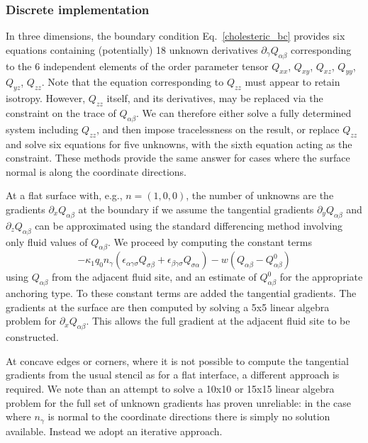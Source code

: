 \subsubsection{Discrete implementation}

In three dimensions, the boundary condition Eq.~\ref{cholesteric_bc}
provides six equations containing (potentially) 18 unknown derivatives
$\partial_\gamma Q_{\alpha\beta}$
corresponding to the 6 independent elements of the order parameter
tensor $Q_{xx}$, $Q_{xy}$, $Q_{xz}$, $Q_{yy}$, $Q_{yz}$, $Q_{zz}$.
Note that the equation corresponding to $Q_{zz}$ must appear to
retain isotropy. However, $Q_{zz}$ itself, and its derivatives,
 may be replaced via the
constraint on the trace of $Q_{\alpha\beta}$. We can therefore either
solve a fully determined system including $Q_{zz}$, and then impose
tracelessness on the result, or replace $Q_{zz}$ and solve six
equations for five unknowns, with the sixth equation acting as the
constraint. These methods provide the same answer for cases where
the surface normal is along the coordinate directions.

At a flat surface with, e.g., $n = (1, 0, 0)$, the number of unknowns
are the gradients $\partial_x Q_{\alpha\beta}$ at the
boundary if we assume the tangential gradients $\partial_y Q_{\alpha\beta}$
and $\partial_z Q_{\alpha\beta}$ can be approximated
using the standard differencing method involving only fluid values of
$Q_{\alpha\beta}$. We proceed by
computing the constant terms
$$
- \kappa_1 q_0 n_\gamma (\epsilon_{\alpha\gamma\sigma} Q_{\sigma\beta}
+ \epsilon_{\beta\gamma\sigma}Q_{\sigma\alpha})
- w(Q_{\alpha\beta} - Q_{\alpha\beta}^0)
$$
using $Q_{\alpha\beta}$ from the adjacent fluid site, and an estimate
of $Q^0_{\alpha\beta}$ for the appropriate anchoring type. To these
constant terms are added the tangential gradients.
The gradients at the surface are then computed by solving a 5x5
linear algebra problem for $\partial_x Q_{\alpha\beta}$. This
allows the full gradient at the adjacent fluid site to be constructed.

At concave edges or corners, where it is not possible to compute the
tangential gradients from the usual stencil as for a flat interface,
a different approach is required. We note than an attempt to solve a
10x10 or 15x15 linear algebra problem for the full set of unknown
gradients has proven unreliable: in the case where $n_\gamma$ is
normal to the coordinate directions there is simply no solution
available. Instead we adopt an iterative approach.

